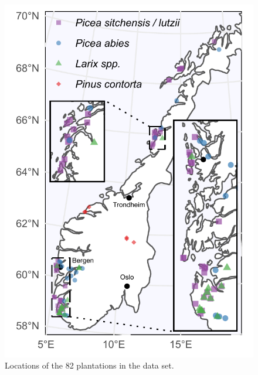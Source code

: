 \documentclass[
]{article}
\begin{document}
\begin{figure}
\centering
\includegraphics{figures/sites-map.pdf}
\caption{\label{fig:sites-map}Locations of the 82 plantations in the data set.}
\end{figure}
\end{document}
